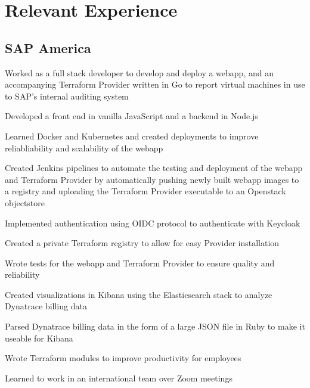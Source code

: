 \documentclass[]{deedy-resume-openfont}
\begin{document}
\begin{minipage}[t]{0.66\textwidth}


    \section{Relevant Experience}

    \subsection{SAP America}
    \vspace{\topsep} %
    \begin{tightemize}
        \item Worked as a full stack developer to develop and deploy a webapp, and an accompanying Terraform Provider written in Go to report virtual machines in use to SAP's internal auditing system
        \item Developed a front end in vanilla JavaScript and a backend in Node.js
        \item Learned Docker and Kubernetes and created deployments to improve reliabliability and scalability of the webapp
        \item Created Jenkins pipelines to automate the testing and deployment of the webapp and Terraform Provider by automatically pushing newly built webapp images to a registry and uploading the Terraform Provider executable to an Openstack objectstore
        \item Implemented authentication using OIDC protocol to authenticate with Keycloak
        \item Created a private Terraform registry to allow for easy Provider installation
        \item Wrote tests for the webapp and Terraform Provider to ensure quality and reliability
        \item Created visualizations in Kibana using the Elasticsearch stack to analyze Dynatrace billing data 
        \item Parsed Dynatrace billing data in the form of a large JSON file in Ruby to make it useable for Kibana
        \item Wrote Terraform modules to improve productivity for employees
        \item Learned to work in an international team over Zoom meetings
    \end{tightemize}
    \sectionsep
    

\end{minipage}
\end{document}
